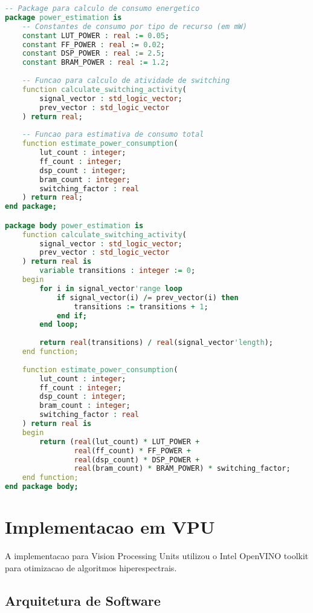 \begin{lstlisting}[language=VHDL]
-- Package para calculo de consumo energetico
package power_estimation is
    -- Constantes de consumo por tipo de recurso (em mW)
    constant LUT_POWER : real := 0.05;
    constant FF_POWER : real := 0.02;
    constant DSP_POWER : real := 2.5;
    constant BRAM_POWER : real := 1.2;
    
    -- Funcao para calculo de atividade de switching
    function calculate_switching_activity(
        signal_vector : std_logic_vector;
        prev_vector : std_logic_vector
    ) return real;
    
    -- Funcao para estimativa de consumo total
    function estimate_power_consumption(
        lut_count : integer;
        ff_count : integer;
        dsp_count : integer;
        bram_count : integer;
        switching_factor : real
    ) return real;
end package;

package body power_estimation is
    function calculate_switching_activity(
        signal_vector : std_logic_vector;
        prev_vector : std_logic_vector
    ) return real is
        variable transitions : integer := 0;
    begin
        for i in signal_vector'range loop
            if signal_vector(i) /= prev_vector(i) then
                transitions := transitions + 1;
            end if;
        end loop;
        
        return real(transitions) / real(signal_vector'length);
    end function;
    
    function estimate_power_consumption(
        lut_count : integer;
        ff_count : integer;
        dsp_count : integer;
        bram_count : integer;
        switching_factor : real
    ) return real is
    begin
        return (real(lut_count) * LUT_POWER + 
                real(ff_count) * FF_POWER +
                real(dsp_count) * DSP_POWER +
                real(bram_count) * BRAM_POWER) * switching_factor;
    end function;
end package body;
\end{lstlisting}

\section{Implementacao em VPU}\label{sec:implementacao_vpu}

A implementacao para Vision Processing Units utilizou o Intel OpenVINO toolkit para otimizacao de algoritmos hiperespectrais.

\subsection{Arquitetura de Software}

